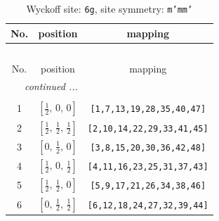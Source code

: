 \documentclass[fleqn,8pt]{jsarticle}
\begin{document}
\renewcommand{\arraystretch}{1.2}
\begin{longtable}{ccc}
\caption{Wyckoff site: {\tt 6g}, site symmetry: {\tt m'mm'}}
 \\
 \hline \hline
No. & position & mapping \\ \hline \endfirsthead

\multicolumn{2}{l}{\tablename\ \thetable{}} \\
 \hline \hline
No. & position & mapping \\ \hline \endhead

 \hline \hline
\multicolumn{2}{r}{\footnotesize\it continued ...} \\ \endfoot

 \hline \hline
\multicolumn{2}{r}{} \\ \endlastfoot

1 & $\left[ \frac{1}{2},\, 0,\, 0 \right]$ & {\tt [1,7,13,19,28,35,40,47]} \\ \hline
2 & $\left[ \frac{1}{2},\, \frac{1}{2},\, \frac{1}{2} \right]$ & {\tt [2,10,14,22,29,33,41,45]} \\ \hline
3 & $\left[ 0,\, \frac{1}{2},\, 0 \right]$ & {\tt [3,8,15,20,30,36,42,48]} \\ \hline
4 & $\left[ \frac{1}{2},\, 0,\, \frac{1}{2} \right]$ & {\tt [4,11,16,23,25,31,37,43]} \\ \hline
5 & $\left[ \frac{1}{2},\, \frac{1}{2},\, 0 \right]$ & {\tt [5,9,17,21,26,34,38,46]} \\ \hline
6 & $\left[ 0,\, \frac{1}{2},\, \frac{1}{2} \right]$ & {\tt [6,12,18,24,27,32,39,44]} \\
\end{longtable}
\renewcommand{\arraystretch}{1.2}
\end{document}
